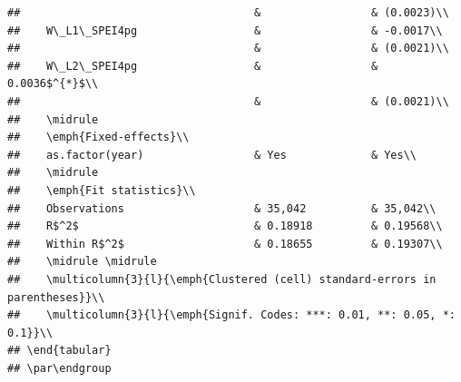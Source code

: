\documentclass[
  a4paper,
]{article}
\begin{document}
\begin{verbatim}
##                                    &                 & (0.0023)\\   
##    W\_L1\_SPEI4pg                  &                 & -0.0017\\   
##                                    &                 & (0.0021)\\   
##    W\_L2\_SPEI4pg                  &                 & 0.0036$^{*}$\\   
##                                    &                 & (0.0021)\\   
##    \midrule
##    \emph{Fixed-effects}\\
##    as.factor(year)                 & Yes             & Yes\\  
##    \midrule
##    \emph{Fit statistics}\\
##    Observations                    & 35,042          & 35,042\\  
##    R$^2$                           & 0.18918         & 0.19568\\  
##    Within R$^2$                    & 0.18655         & 0.19307\\  
##    \midrule \midrule
##    \multicolumn{3}{l}{\emph{Clustered (cell) standard-errors in parentheses}}\\
##    \multicolumn{3}{l}{\emph{Signif. Codes: ***: 0.01, **: 0.05, *: 0.1}}\\
## \end{tabular}
## \par\endgroup
\end{verbatim}
\end{document}
